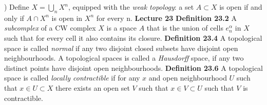 \newline {}) Define $X = \bigcup_n X^n$, equipped with the \textit{weak topology}: a set $A \subset X$ is open if and only if $A \cap X^n$ is open in $X^n$ for every n.
\newline \newline \textbf{Lecture 23}
\newline \newline \textbf{Definition 23.2} A \textit{subcomplex} of a CW complex $X$ is a space $A$ that is the union of cells $e_n^\alpha$ in $X$ such that for every cell it also contains its closure.
\newline \newline \textbf{Definition 23.4} A topological space is called \textit{normal} if any two disjoint closed subsets have disjoint open neighbourhoods. A topological spaces is called a \textit{Hausdorff} space, if any two distinct points have disjoint open neighbourhoods.
\newline \newline \textbf{Definition 23.6} A topological space is called \textit{locally contractible} if for any $x$ and open neighbourhood $U$ such that $x \in U \subset X$ there exists an open set $V$ such that $x \in V \subset U$ such that $V$ is contractible.
 